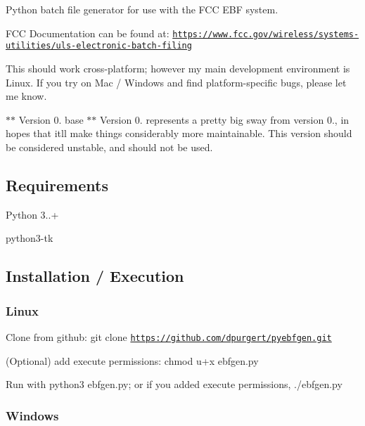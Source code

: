 Python batch file generator for use with the F\+CC E\+BF system.

F\+CC Documentation can be found at\+: \href{https://www.fcc.gov/wireless/systems-utilities/uls-electronic-batch-filing}{\tt https\+://www.\+fcc.\+gov/wireless/systems-\/utilities/uls-\/electronic-\/batch-\/filing}

This should work cross-\/platform; however my main development environment is Linux. If you try on Mac / Windows and find platform-\/specific bugs, please let me know.

$\ast$$\ast$ Version 0. base $\ast$$\ast$ Version 0. represents a pretty big sway from version 0., in hopes that it\textquotesingle{}ll make things considerably more maintainable. This version should be considered unstable, and should not be used.

\subsection*{Requirements}


\begin{DoxyItemize}
\item Python 3..+
\item python3-\/tk
\end{DoxyItemize}

\subsection*{Installation / Execution}

\subsubsection*{Linux}


\begin{DoxyItemize}
\item Clone from github\+: {\ttfamily git clone \href{https://github.com/dpurgert/pyebfgen.git}{\tt https\+://github.\+com/dpurgert/pyebfgen.\+git}}
\item (Optional) add execute permissions\+: {\ttfamily chmod u+x ebfgen.\+py}
\item Run with {\ttfamily python3 ebfgen.\+py}; or if you added execute permissions, {\ttfamily ./ebfgen.py}
\end{DoxyItemize}

\subsubsection*{Windows}



